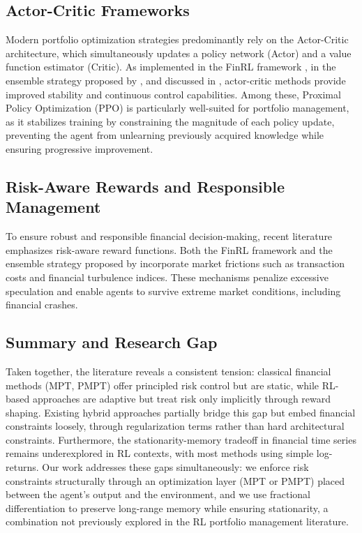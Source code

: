 \documentclass[final]{article}
\begin{document}
\subsection{Actor-Critic Frameworks}
Modern portfolio optimization strategies predominantly rely on the Actor-Critic architecture, which simultaneously
updates a policy network (Actor) and a value function estimator (Critic). As implemented in the FinRL framework
\citep{liu2020finrl}, in the ensemble strategy proposed by \citet{yang2025ensemble}, and discussed in \citet{jang2023deep},
actor-critic methods provide improved stability and continuous control capabilities. Among these, Proximal Policy
Optimization (PPO) \citep{schulman2017proximal} is particularly well-suited for portfolio management, as it stabilizes training by constraining the
magnitude of each policy update, preventing the agent from unlearning previously acquired knowledge while ensuring
progressive improvement.

\subsection{Risk-Aware Rewards and Responsible Management}
To ensure robust and responsible financial decision-making, recent literature emphasizes risk-aware reward functions.
Both the FinRL framework \citep{liu2020finrl} and the ensemble strategy proposed by \citet{yang2025ensemble} incorporate
market frictions such as transaction costs and financial turbulence indices. These mechanisms penalize excessive
speculation and enable agents to survive extreme market conditions, including financial crashes.

\subsection{Summary and Research Gap}
Taken together, the literature reveals a consistent tension: classical financial methods (MPT, PMPT) offer principled
risk control but are static, while RL-based approaches are adaptive but treat risk only implicitly through reward shaping.
Existing hybrid approaches \citep{jang2023deep, liu2020finrl} partially bridge this gap but embed financial constraints
loosely, through regularization terms rather than hard architectural constraints. Furthermore, the stationarity-memory
tradeoff in financial time series remains underexplored in RL contexts, with most methods using simple log-returns. Our
work addresses these gaps simultaneously: we enforce risk constraints structurally through an optimization layer (MPT or
PMPT) placed between the agent's output and the environment, and we use fractional differentiation to preserve
long-range memory while ensuring stationarity, a combination not previously explored in the RL portfolio management
literature.
\end{document}
